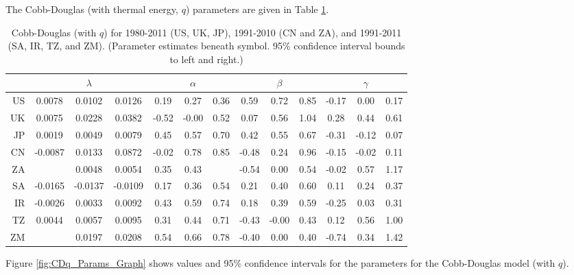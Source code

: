 \documentclass[preprint,authoryear,12pt]{elsarticle}\usepackage{graphicx, color}
\begin{document}
The Cobb-Douglas (with thermal energy, $q$) parameters are given in Table \ref{tab:CD_Parameters_With_Q}.

\begin{table}[ht]
\begin{center}
\caption{Cobb-Douglas (with $q$) for 1980-2011 (US, UK, JP), 1991-2010 (CN and ZA), and 1991-2011 (SA, IR, TZ, and ZM). (Parameter estimates beneath symbol. 95\% confidence interval bounds to left and right.)}
\label{tab:CD_Parameters_With_Q}
{\tiny
\begin{tabular}{r|ccc|ccc|ccc|ccc}
  \hline
 &   & $\lambda$ &   &   & $\alpha$ &   &   & $\beta$ &   &   & $\gamma$ &   \\ 
  \hline
US & 0.0078 & 0.0102 & 0.0126 & 0.19 & 0.27 & 0.36 & 0.59 & 0.72 & 0.85 & -0.17 & 0.00 & 0.17 \\ 
  UK & 0.0075 & 0.0228 & 0.0382 & -0.52 & -0.00 & 0.52 & 0.07 & 0.56 & 1.04 & 0.28 & 0.44 & 0.61 \\ 
  JP & 0.0019 & 0.0049 & 0.0079 & 0.45 & 0.57 & 0.70 & 0.42 & 0.55 & 0.67 & -0.31 & -0.12 & 0.07 \\ 
  CN & -0.0087 & 0.0133 & 0.0872 & -0.02 & 0.78 & 0.85 & -0.48 & 0.24 & 0.96 & -0.15 & -0.02 & 0.11 \\ 
  ZA &  & 0.0048 & 0.0054 & 0.35 & 0.43 &  & -0.54 & 0.00 & 0.54 & -0.02 & 0.57 & 1.17 \\ 
  SA & -0.0165 & -0.0137 & -0.0109 & 0.17 & 0.36 & 0.54 & 0.21 & 0.40 & 0.60 & 0.11 & 0.24 & 0.37 \\ 
  IR & -0.0026 & 0.0033 & 0.0092 & 0.43 & 0.59 & 0.74 & 0.18 & 0.39 & 0.59 & -0.25 & 0.03 & 0.31 \\ 
  TZ & 0.0044 & 0.0057 & 0.0095 & 0.31 & 0.44 & 0.71 & -0.43 & -0.00 & 0.43 & 0.12 & 0.56 & 1.00 \\ 
  ZM &  & 0.0197 & 0.0208 & 0.54 & 0.66 & 0.78 & -0.40 & 0.00 & 0.40 & -0.74 & 0.34 & 1.42 \\ 
   \hline
\end{tabular}
}
\end{center}
\end{table}



Figure \ref{fig:CDq_Params_Graph} shows values and 95\% confidence intervals for the parameters for the Cobb-Douglas model (with $q$).
\end{document}
